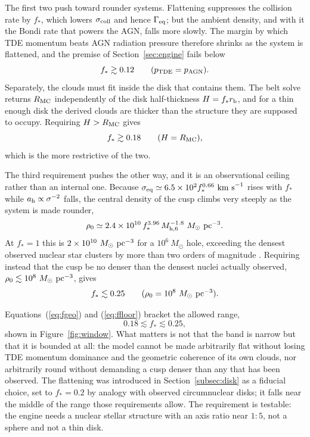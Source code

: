 \documentclass[preprint2]{aastex}
\newcommand{\msun}{M_{\odot}\xspace}
\newcommand{\mhsix}{M_{\rm h,6}\xspace}
\begin{document}
The first two push toward rounder systems. Flattening suppresses the collision rate by $f_{\ast}$, which lowers $\sigma_{\rm coll}$ and hence $\Gamma_{\rm eq}$; but the ambient density, and with it the Bondi rate that powers the AGN, falls more slowly. The margin by which TDE momentum beats AGN radiation pressure therefore shrinks as the system is flattened, and the premise of Section~\ref{sec:engine} fails below
\begin{equation}
f_{\ast} \gtrsim 0.12 \quad\quad (p_{\rm TDE} = p_{\rm AGN}).\label{eq:fagn}
\end{equation}
Separately, the clouds must fit inside the disk that contains them. The belt solve returns $R_{\rm MC}$ independently of the disk half-thickness $H = f_{\ast} r_{\rm b}$, and for a thin enough disk the derived clouds are thicker than the structure they are supposed to occupy. Requiring $H > R_{\rm MC}$ gives
\begin{equation}
f_{\ast} \gtrsim 0.18 \quad\quad (H = R_{\rm MC}),\label{eq:fgeo}
\end{equation}
which is the more restrictive of the two.

The third requirement pushes the other way, and it is an observational ceiling rather than an internal one. Because $\sigma_{\rm eq} \simeq 6.5 \times 10^{2} f_{\ast}^{0.66}~{\rm km~s}^{-1}$ rises with $f_{\ast}$ while $a_{\rm h} \propto \sigma^{-2}$ falls, the central density of the cusp climbs very steeply as the system is made rounder,
\begin{equation}
\rho_{0} \simeq 2.4 \times 10^{10}\, f_{\ast}^{3.96}\, \mhsix^{-1.8}~\msun~{\rm pc}^{-3}.\label{eq:rho0f}
\end{equation}
At $f_{\ast} = 1$ this is $2 \times 10^{10}~\msun~{\rm pc}^{-3}$ for a $10^{6}~\msun$ hole, exceeding the densest observed nuclear star clusters by more than two orders of magnitude \citep{Neumayer:2020a}. Requiring instead that the cusp be no denser than the densest nuclei actually observed, $\rho_{0} \lesssim 10^{8}~\msun~{\rm pc}^{-3}$, gives
\begin{equation}
f_{\ast} \lesssim 0.25 \quad\quad (\rho_{0} = 10^{8}~\msun~{\rm pc}^{-3}).\label{eq:ffloor}
\end{equation}

Equations~(\ref{eq:fgeo}) and (\ref{eq:ffloor}) bracket the allowed range,
\begin{equation}
0.18 \lesssim f_{\ast} \lesssim 0.25,\label{eq:fwindow}
\end{equation}
shown in Figure~\ref{fig:window}. What matters is not that the band is narrow but that it is bounded at all: the model cannot be made arbitrarily flat without losing TDE momentum dominance and the geometric coherence of its own clouds, nor arbitrarily round without demanding a cusp denser than any that has been observed. The flattening was introduced in Section~\ref{subsec:disk} as a fiducial choice, set to $f_{\ast} = 0.2$ by analogy with observed circumnuclear disks; it falls near the middle of the range those requirements allow. The requirement is testable: the engine needs a nuclear stellar structure with an axis ratio near $1{:}5$, not a sphere and not a thin disk.
\end{document}
